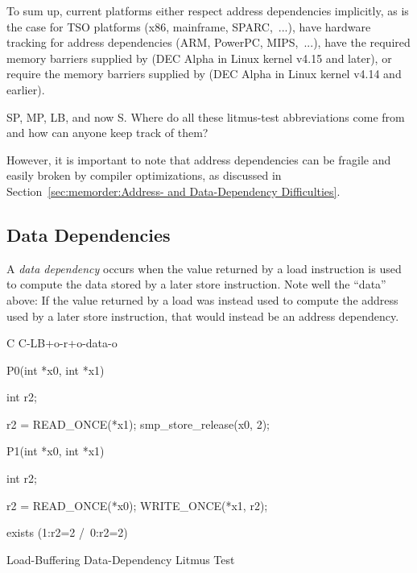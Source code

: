 {	To sum up, current platforms either respect address dependencies
	implicitly, as is the case for TSO platforms (x86, mainframe,
	SPARC,~...), have hardware tracking for address dependencies
	(ARM, PowerPC, MIPS,~...), have the required memory barriers
	supplied by  (DEC Alpha in Linux kernel v4.15 and
	later), or require the memory barriers supplied by
	 (DEC Alpha in Linux kernel v4.14 and earlier).
} \QuickQuizEnd

\QuickQuiz{}
	SP, MP, LB, and now S.
	Where do all these litmus-test abbreviations come from and
	how can anyone keep track of them?
 \QuickQuizEnd

However, it is important to note that address dependencies can
be fragile and easily broken by compiler optimizations, as discussed in
Section~\ref{sec:memorder:Address- and Data-Dependency Difficulties}.

\subsection{Data Dependencies}
\label{sec:memorder:Data Reordering}

A \emph{data dependency} occurs when the value returned by a load
instruction is used to compute the data stored by a later store
instruction.
Note well the ``data'' above: If the value returned by a load
was instead used to compute the address used by a later store
instruction, that would instead be an address dependency.

\begin{listing}[tbp]
{ \scriptsize
\begin{verbbox}[\LstLineNo]
C C-LB+o-r+o-data-o
{
}

P0(int *x0, int *x1)
{
  int r2;

  r2 = READ_ONCE(*x1);
  smp_store_release(x0, 2);
}


P1(int *x0, int *x1)
{
  int r2;

  r2 = READ_ONCE(*x0);
  WRITE_ONCE(*x1, r2);
}

exists (1:r2=2 /\ 0:r2=2)
\end{verbbox}
}
\centering
\theverbbox
\caption{Load-Buffering Data-Dependency Litmus Test}
\label{lst:memorder:Load-Buffering Data-Dependency Litmus Test}
\end{listing}

